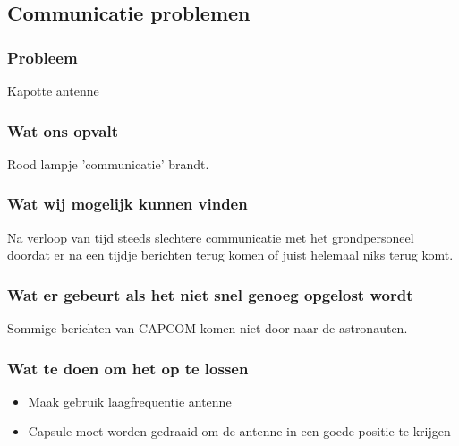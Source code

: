 \subsection{Communicatie problemen}

\subsubsection{Probleem}
Kapotte antenne

\subsubsection{Wat ons opvalt}
Rood lampje 'communicatie' brandt. 

\subsubsection{Wat wij mogelijk kunnen vinden}
Na verloop van tijd steeds slechtere communicatie met het grondpersoneel doordat er na een tijdje berichten terug komen of juist helemaal niks terug komt.

\subsubsection{Wat er gebeurt als het niet snel genoeg opgelost wordt}
Sommige berichten van CAPCOM komen niet door naar de astronauten.

\subsubsection{Wat te doen om het op te lossen}
\begin{itemize}
    \item Maak gebruik laagfrequentie antenne
    \item Capsule moet worden gedraaid om de antenne in een goede positie te krijgen
\end{itemize}